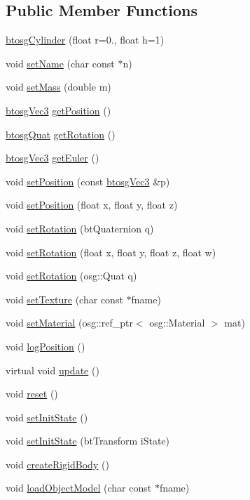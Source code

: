\subsection*{Public Member Functions}
\begin{DoxyCompactItemize}
\item 
\hyperlink{classbtosgCylinder_a85e2517d8fd8a16ad7514f2f70cc1086}{btosg\+Cylinder} (float r=0., float h=1)
\item 
void \hyperlink{classbtosgObject_ab06a1b3f357209214c6440cd5746523e}{set\+Name} (char const $\ast$n)
\item 
void \hyperlink{classbtosgObject_a91da93c82d48b86192f0cbb16054fe57}{set\+Mass} (double m)
\item 
\hyperlink{classbtosgVec3}{btosg\+Vec3} \hyperlink{classbtosgObject_a3dadd5da8f2a312e44a039446b93d4cd}{get\+Position} ()
\item 
\hyperlink{classbtosgQuat}{btosg\+Quat} \hyperlink{classbtosgObject_a3b825999ad3a51bde743d4085ff19dae}{get\+Rotation} ()
\item 
\hyperlink{classbtosgVec3}{btosg\+Vec3} \hyperlink{classbtosgObject_a2019ec63bde02b72600450c7c985e77a}{get\+Euler} ()
\item 
void \hyperlink{classbtosgObject_ace6b51040b7ddce90818174200cc6074}{set\+Position} (const \hyperlink{classbtosgVec3}{btosg\+Vec3} \&p)
\item 
void \hyperlink{classbtosgObject_adb9f2cff0faf66dc252cd7c97b11ac84}{set\+Position} (float x, float y, float z)
\item 
void \hyperlink{classbtosgObject_a656412794a971a10478aedb520f298bf}{set\+Rotation} (bt\+Quaternion q)
\item 
void \hyperlink{classbtosgObject_a4d21ca59b944fd26644db35d3e9ba67a}{set\+Rotation} (float x, float y, float z, float w)
\item 
void \hyperlink{classbtosgObject_ae803e0566f0d7b3ffca686b968b297f8}{set\+Rotation} (osg\+::\+Quat q)
\item 
void \hyperlink{classbtosgObject_aff54acbc7c66811efb0cf2838107a241}{set\+Texture} (char const $\ast$fname)
\item 
void \hyperlink{classbtosgObject_a6ab7b9e0553dab398b980637788b56a8}{set\+Material} (osg\+::ref\+\_\+ptr$<$ osg\+::\+Material $>$ mat)
\item 
void \hyperlink{classbtosgObject_acfd70fa6477c80fd7f29ad7ab9f4f067}{log\+Position} ()
\item 
virtual void \hyperlink{classbtosgObject_a342917817dfde62554f83da8e0d5110b}{update} ()
\item 
void \hyperlink{classbtosgObject_a93983f9180dd0672f8779cf2baa78580}{reset} ()
\item 
void \hyperlink{classbtosgObject_ad1508a0ce28cfac83e5f0ff6245f91b5}{set\+Init\+State} ()
\item 
void \hyperlink{classbtosgObject_a6ceb08e59ee95acaaef389ee198d2b56}{set\+Init\+State} (bt\+Transform i\+State)
\item 
void \hyperlink{classbtosgObject_a029dbe9134fa94e7355799f67fb2cd6d}{create\+Rigid\+Body} ()
\item 
void \hyperlink{classbtosgObject_a91838b8235579da178fcc06e6d3d47f3}{load\+Object\+Model} (char const $\ast$fname)
\end{DoxyCompactItemize}
